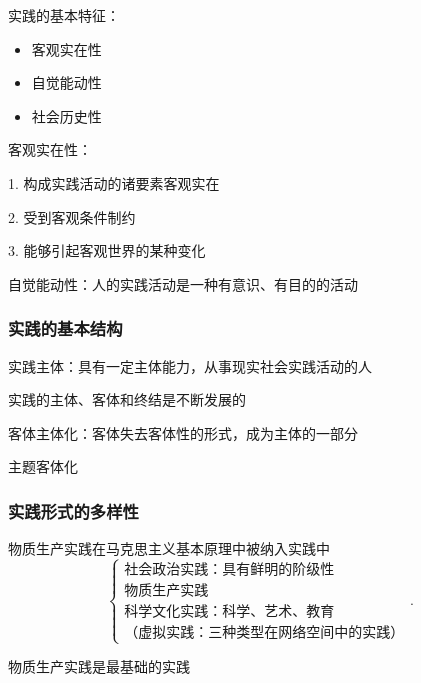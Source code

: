 实践的基本特征：
\begin{itemize}
    \item 客观实在性
    \item 自觉能动性
    \item 社会历史性
\end{itemize}
\begin{notation}
    客观实在性：

    1. 构成实践活动的诸要素客观实在

    2. 受到客观条件制约

    3. 能够引起客观世界的某种变化
\end{notation}
\begin{notation}
    自觉能动性：人的实践活动是一种有意识、有目的的活动
\end{notation}
\subsubsection{实践的基本结构}%
\label{subsub:实践的基本结构}
\begin{defi}
    实践主体：具有一定主体能力，从事现实社会实践活动的人
\end{defi}
实践的主体、客体和终结是不断发展的
\begin{notation}
    客体主体化：客体失去客体性的形式，成为主体的一部分
\end{notation}
\begin{notation}
    主题客体化
\end{notation}
\subsubsection{实践形式的多样性}%
\label{subsub:实践形式的多样性}
物质生产实践在马克思主义基本原理中被纳入实践中
\[
    \begin{cases}
        \text{社会政治实践：具有鲜明的阶级性}\\
        \text{物质生产实践}\\
        \text{科学文化实践：科学、艺术、教育}\\
        \text{（虚拟实践：三种类型在网络空间中的实践）}
    \end{cases}
.\] 
\begin{notation}
    物质生产实践是最基础的实践
\end{notation}




